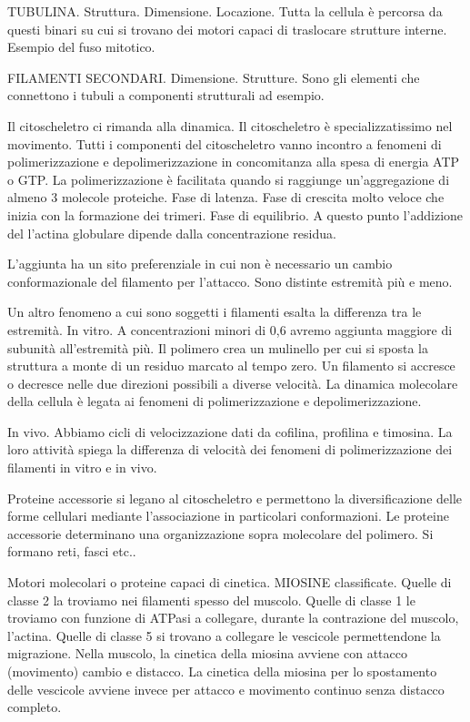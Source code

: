 \documentclass[a4paper,12pt]{article}
\begin{document}
TUBULINA. Struttura. Dimensione. Locazione.
Tutta la cellula è percorsa da questi binari su cui si trovano dei motori capaci di traslocare strutture interne. Esempio del fuso mitotico.

FILAMENTI SECONDARI. Dimensione. Strutture.
Sono gli elementi che connettono i tubuli a componenti strutturali ad esempio.

Il citoscheletro ci rimanda alla dinamica. Il citoscheletro è specializzatissimo nel movimento. Tutti i componenti del citoscheletro vanno incontro a fenomeni di polimerizzazione e depolimerizzazione in concomitanza alla spesa di energia ATP o GTP. La polimerizzazione è facilitata quando si raggiunge un'aggregazione di almeno 3 molecole proteiche. 
Fase di latenza. Fase di crescita molto veloce che inizia con la formazione dei trimeri. Fase di equilibrio. A questo punto l'addizione del l'actina globulare dipende dalla concentrazione residua.

L'aggiunta ha un sito preferenziale in cui non è necessario un cambio conformazionale del filamento per l'attacco. Sono distinte estremità più e meno.

Un altro fenomeno a cui sono soggetti i filamenti esalta la differenza tra le estremità.
In vitro. A concentrazioni minori di 0,6 avremo aggiunta maggiore di subunità all'estremità più. Il polimero crea un mulinello per cui si sposta la struttura a monte di un residuo marcato al tempo zero.
Un filamento si accresce o decresce nelle due direzioni possibili a diverse velocità. La dinamica molecolare della cellula è legata ai fenomeni di polimerizzazione e depolimerizzazione.

In vivo. Abbiamo cicli di velocizzazione dati da cofilina, profilina e timosina. La loro attività spiega la differenza di velocità dei fenomeni di polimerizzazione dei filamenti in vitro e in vivo.


Proteine accessorie si legano al citoscheletro e permettono la diversificazione delle forme cellulari mediante l'associazione in particolari conformazioni. 
Le proteine accessorie determinano una organizzazione sopra molecolare del polimero.
Si formano reti, fasci etc..

Motori molecolari o proteine capaci di cinetica.
MIOSINE classificate. Quelle di classe 2 la troviamo nei filamenti spesso del muscolo.
Quelle di classe 1 le troviamo con funzione di ATPasi a collegare, durante la contrazione del muscolo, l'actina. Quelle di classe 5 si trovano a collegare le vescicole permettendone la migrazione.
Nella muscolo, la cinetica della miosina avviene con attacco (movimento) cambio e distacco. La cinetica della miosina per lo spostamento delle vescicole avviene invece per attacco e movimento continuo senza distacco completo.
\end{document}
